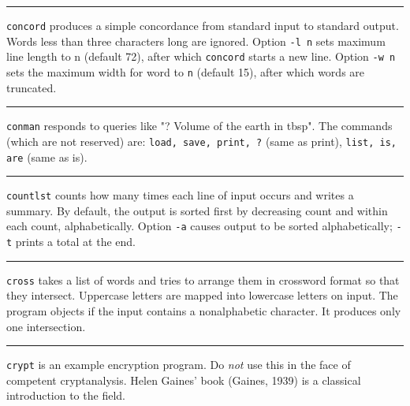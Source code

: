 {\vspace{0.25cm}\hrule{}

\texttt{concord} produces a simple concordance from standard input to
standard output. Words less than three characters long are ignored.
Option \texttt{{}-l n} sets maximum line length to
n (default 72), after which \texttt{concord} starts a new line. Option
\texttt{{}-w n} sets the maximum width for word to \texttt{n}
(default 15), after which words are truncated.

\pagebreak

\vspace{0.25cm}\hrule{}

\texttt{conman} responds to queries like "? Volume of the
earth in tbsp". The commands (which are
not reserved) are: \texttt{load, save, print, ?} (same as print),
\texttt{list, is, are} (same as is).

\vspace{0.25cm}\hrule{}

\texttt{countlst} counts how many times each line of input occurs and
writes a summary. By default, the output is sorted first by
decreasing count and within each count, alphabetically. Option
\texttt{{}-a} causes output to be sorted alphabetically;
\texttt{{}-t} prints a total at the end.

\vspace{0.25cm}\hrule{}

\texttt{cross} takes a list of words and tries to arrange them in
crossword format so that they intersect. Uppercase letters are mapped
into lowercase letters on input. The program objects if the input
contains a nonalphabetic character. It produces only one %
intersection.

\vspace{0.25cm}\hrule{}

\texttt{crypt} is an example encryption program. Do
\textit{not} use this in the face of competent cryptanalysis. Helen
Gaines' book (Gaines, 1939) is a classical
introduction to the field.

}

